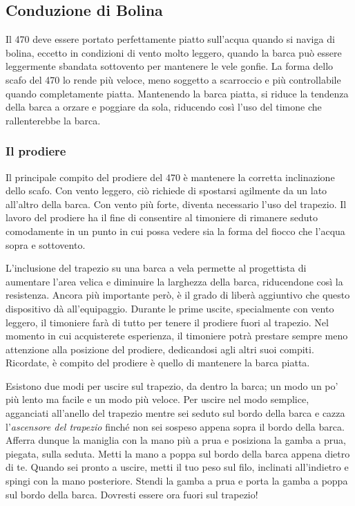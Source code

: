 
\subsection{Conduzione di Bolina}
\label{subsec:ConduzioneDiBolina}
Il 470 deve essere portato perfettamente piatto sull'acqua quando si naviga di
bolina, eccetto in condizioni di vento molto leggero, quando la barca può essere
leggermente sbandata sottovento per mantenere le vele gonfie. La forma dello
scafo del 470 lo rende più veloce, meno soggetto a scarroccio e più
controllabile quando completamente piatta. Mantenendo la barca piatta, si riduce
la tendenza della barca a orzare e poggiare da sola, riducendo così l'uso del
timone che rallenterebbe la barca.

\subsubsection{Il prodiere}
\label{subsubsec:IlProdiere}
Il principale compito del prodiere del 470 è mantenere la corretta
inclinazione dello scafo. Con vento leggero, ciò richiede di spostarsi agilmente
da un lato all'altro della barca. Con vento più forte, diventa necessario l'uso
del trapezio. Il lavoro del prodiere ha il fine di consentire al timoniere di
rimanere seduto comodamente in un punto in cui possa vedere sia la forma del
fiocco che l'acqua sopra e sottovento.

L'inclusione del trapezio su una barca a vela permette al progettista di
aumentare l'area velica e diminuire la larghezza della barca, riducendone così
la resistenza. Ancora più importante però, è il grado di liberà aggiuntivo che questo
dispositivo dà all'equipaggio. Durante le prime uscite, specialmente con vento
leggero, il timoniere farà di tutto per tenere il prodiere fuori al trapezio.
Nel momento in cui acquisterete esperienza, il timoniere potrà prestare
sempre meno attenzione alla posizione del prodiere, dedicandosi agli altri suoi
compiti. Ricordate, è compito del prodiere è quello di mantenere la barca
piatta.

Esistono due modi per uscire sul trapezio, da dentro la barca; un modo un po'
più lento ma facile e un modo più veloce. Per uscire nel modo semplice,
agganciati all'anello del trapezio mentre sei seduto sul bordo della barca e
cazza l'\emph{ascensore del trapezio} finché non sei sospeso appena sopra il
bordo della barca. Afferra dunque la maniglia
con la mano più a prua e posiziona la gamba a prua, piegata, sulla seduta. Metti
la mano a poppa sul bordo della barca appena dietro di te. Quando sei pronto
a uscire, metti il tuo peso sul filo, inclinati all'indietro e spingi con la
mano posteriore. Stendi la gamba a prua e porta la gamba a poppa sul bordo
della barca. Dovresti essere ora fuori sul trapezio!

